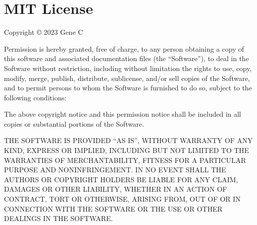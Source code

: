 \documentclass[letterpaper,10pt,english]{sphinxmanual}
\begin{document}
\begin{sphinxVerbatim}[commandchars=\\\{\}]
   
 
\end{sphinxVerbatim}

\sphinxAtStartPar
{}

\begin{sphinxVerbatim}[commandchars=\\\{\}]
  
\end{sphinxVerbatim}

\sphinxAtStartPar
{}

\begin{sphinxVerbatim}[commandchars=\\\{\}]
 
\end{sphinxVerbatim}

\sphinxstepscope


\chapter{MIT License}
\label{\detokenize{License:mit-license}}\label{\detokenize{License::doc}}
\sphinxAtStartPar
Copyright © 2023 Gene C

\sphinxAtStartPar
Permission is hereby granted, free of charge, to any person obtaining a copy
of this software and associated documentation files (the “Software”), to deal
in the Software without restriction, including without limitation the rights
to use, copy, modify, merge, publish, distribute, sublicense, and/or sell
copies of the Software, and to permit persons to whom the Software is
furnished to do so, subject to the following conditions:

\sphinxAtStartPar
The above copyright notice and this permission notice shall be included in all
copies or substantial portions of the Software.

\sphinxAtStartPar
THE SOFTWARE IS PROVIDED “AS IS”, WITHOUT WARRANTY OF ANY KIND, EXPRESS OR
IMPLIED, INCLUDING BUT NOT LIMITED TO THE WARRANTIES OF MERCHANTABILITY,
FITNESS FOR A PARTICULAR PURPOSE AND NONINFRINGEMENT. IN NO EVENT SHALL THE
AUTHORS OR COPYRIGHT HOLDERS BE LIABLE FOR ANY CLAIM, DAMAGES OR OTHER
LIABILITY, WHETHER IN AN ACTION OF CONTRACT, TORT OR OTHERWISE, ARISING FROM,
OUT OF OR IN CONNECTION WITH THE SOFTWARE OR THE USE OR OTHER DEALINGS IN THE
SOFTWARE.
\end{document}
